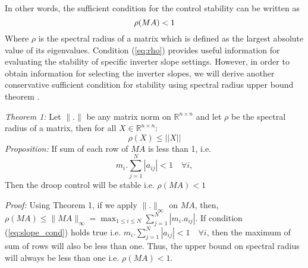 \documentclass[journal]{IEEEtran}
\begin{document}
In other words, the sufficient condition for the control stability can be written as
\vspace{-2mm}
\begin{equation}
\small
\label{eq:rho}
\rho(MA)<1
\vspace{-3mm}
\end{equation}
Where $\rho$ is the spectral radius of a matrix which is defined as the largest absolute value of its eigenvalues. Condition (\ref{eq:rho}) provides useful information for evaluating the stability of specific inverter slope settings. However, in order to obtain information for selecting the inverter slopes, we will derive another conservative sufficient condition for stability using spectral radius upper bound theorem \cite{horn_matrix_2012}.

\textit{Theorem 1:} Let $\|.\|$ be any matrix norm on $\mathbb{R}^{n \times n}$ and let $\rho$ be the spectral radius of a matrix, then for all $X \in \mathbb{R}^{n \times n}$:
\begin{equation}
\label{eq:rho_X}
\rho(X)\leq ||X||
\end{equation}
\textit{Proposition:} If sum of each row of $MA$ is less than 1, i.e.
\begin{equation}
\label{eq:slope_cond}
m_i. \sum_{j=1}^{N}|a_{ij}|< 1 \quad \forall i ,
\end{equation}
Then the droop control will be stable i.e. $\rho(MA)<1$

\textit{Proof:} Using Theorem 1, if we apply {\small $\|.\|_\infty$} on {\small $MA$}, then,
{\small $\rho(MA)\leq \|MA\|_\infty=\max_{1\leq i\leq N}\sum_{j=1}^{N}|m_i.a_{ij}|$}. If condition (\ref{eq:slope_cond}) holds true i.e. {\small $m_i. \sum_{j=1}^{N}|a_{ij}|< 1 \quad \forall i$}, then the maximum of sum of rows will also be less than one. Thus, the upper bound on spectral radius will always be less than one i.e. {\small $\rho(MA)<1$}.  
\end{document}
